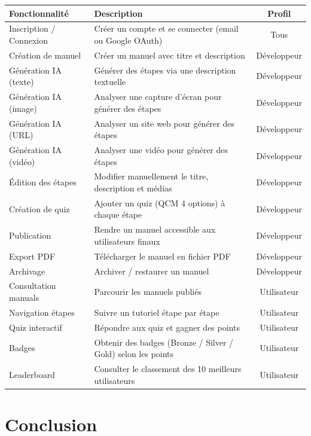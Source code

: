 \documentclass[12pt, a4paper]{article}
\begin{document}
\begin{center}
\renewcommand{\arraystretch}{1.4}
\begin{tabularx}{\linewidth}{lXc}
\toprule
\textbf{Fonctionnalité} & \textbf{Description} & \textbf{Profil} \\
\midrule
Inscription / Connexion & Créer un compte et se connecter (email ou Google OAuth) & Tous \\
\midrule
Création de manuel & Créer un manuel avec titre et description & Développeur \\
Génération IA (texte) & Générer des étapes via une description textuelle & Développeur \\
Génération IA (image) & Analyser une capture d'écran pour générer des étapes & Développeur \\
Génération IA (URL) & Analyser un site web pour générer des étapes & Développeur \\
Génération IA (vidéo) & Analyser une vidéo pour générer des étapes & Développeur \\
Édition des étapes & Modifier manuellement le titre, description et médias & Développeur \\
Création de quiz & Ajouter un quiz (QCM 4 options) à chaque étape & Développeur \\
Publication & Rendre un manuel accessible aux utilisateurs finaux & Développeur \\
Export PDF & Télécharger le manuel en fichier PDF & Développeur \\
Archivage & Archiver / restaurer un manuel & Développeur \\
\midrule
Consultation manuals & Parcourir les manuels publiés & Utilisateur \\
Navigation étapes & Suivre un tutoriel étape par étape & Utilisateur \\
Quiz interactif & Répondre aux quiz et gagner des points & Utilisateur \\
Badges & Obtenir des badges (Bronze / Silver / Gold) selon les points & Utilisateur \\
Leaderboard & Consulter le classement des 10 meilleurs utilisateurs & Utilisateur \\
\bottomrule
\end{tabularx}
\end{center}

\section{Conclusion}
\end{document}
